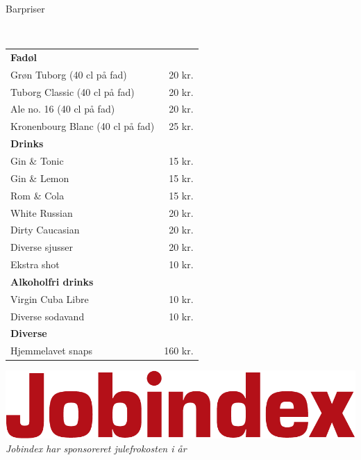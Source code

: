 \begin{flushleft}
\begin{huge}
Barpriser
\end{huge}
\\[.1cm]
\begin{table}[h!]
\begin{tabular}{lr}
\textbf{Fadøl} & \\
Grøn Tuborg (40 cl på fad) & 20 kr.\\
Tuborg Classic (40 cl på fad) & 20 kr.\\
Ale no. 16 (40 cl på fad) & 20 kr.\\
Kronenbourg Blanc (40 cl på fad) & 25 kr.\\[2ex]
\textbf{Drinks} & \\
Gin \& Tonic & 15 kr.\\
Gin \& Lemon & 15 kr.\\
Rom \& Cola & 15 kr.\\
White Russian & 20 kr.\\
Dirty Caucasian & 20 kr.\\
Diverse sjusser & 20 kr.\\
Ekstra shot & 10 kr.\\[2ex]
\textbf{Alkoholfri drinks} & \\
Virgin Cuba Libre & 10 kr.\\
Diverse sodavand & 10 kr.\\[2ex]
\textbf{Diverse} & \\
Hjemmelavet snaps & 160 kr.\\
\end{tabular}
\end{table}
\end{flushleft}
\vfill
\begin{center}
\includegraphics[width=\linewidth]{figures/jobindex_logo_red.png}
\\[2mm]\emph{Jobindex har sponsoreret julefrokosten i år}
\end{center}
